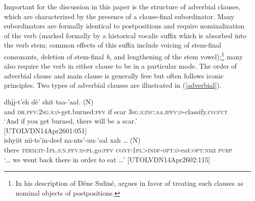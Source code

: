 \documentclass[output=paper,colorlinks,citecolor=brown
]{langscibook}
\begin{document}

Important for the discussion in this paper is the structure of adverbial clauses, which are characterized by the presence of a clause-final subordinator. Many subordinators are formally identical to postpositions and require nominalization of the verb (marked formally by a historical vocalic suffix which is absorbed into the verb stem; common effects of this suffix include voicing of stem-final consonants, deletion of stem-final \textit{h}, and lengthening of the stem vowel);\footnote{In his description of Dëne Sułiné, \citet[375–381]{CookED2004} argues in favor of treating such clauses as nominal objects of postpositions.} many also require the verb in either clause to be in a particular mode. The order of adverbial clause and main clause is generally free but often follows iconic principles. Two types of adverbial clauses are illustrated in (\ref{adverbial}).

\begin{exe}
\ex\label{adverbial}
\begin{xlista}
\ex
{} dhįį-t'eh dè' shit {taa-'aał. \textnormal{(N)}} \\
and \textsc{dh.pfv:2sg.s:ø}-get.burned:\textsc{pfv} if scar \textsc{3sg.s:inc:aa.ipfv:ø}-classify.\textsc{co:fut} \\
\glt `And if you get burned, there will be a scar.' \\ \hfill [UTOLVDN14Apr2601:051]\\
\ex
\gll  {\ldots} ishyiit nii-ts'in-deeł na-nts'-uu-'aal {xah {\ldots} \textnormal{(N)}} \\
{} there \textsc{term:it-1pl.s:n.pfv:d-pl}.go:\textsc{pfv} \textsc{cont-1pl>indf-opt:ø}-eat:\textsc{opt:nmz} \textsc{purp} \\
\glt `{\ldots} we went back there in order to eat \ldots' \hfill [UTOLVDN14Apr2602:115] \\
\end{xlista}
\end{exe}
\end{document}
